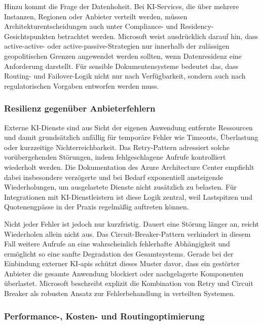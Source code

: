 Hinzu kommt die Frage der Datenhoheit. Bei KI-Services, die über mehrere Instanzen, Regionen oder Anbieter verteilt werden, müssen Architekturentscheidungen auch unter Compliance- und Residency-Gesichtspunkten betrachtet werden. Microsoft weist ausdrücklich darauf hin, dass active-active- oder active-passive-Strategien nur innerhalb der zulässigen geopolitischen Grenzen angewendet werden sollten, wenn Datenresidenz eine Anforderung darstellt. Für sensible Dokumentensysteme bedeutet das, dass Routing- und Failover-Logik nicht nur nach Verfügbarkeit, sondern auch nach regulatorischen Vorgaben entworfen werden muss. \cite{azure_openai_gateway_multi_backend}

\subsubsection{Resilienz gegenüber Anbieterfehlern}

Externe KI-Dienste sind aus Sicht der eigenen Anwendung entfernte Ressourcen und damit grundsätzlich anfällig für temporäre Fehler wie Timeouts, Überlastung oder kurzzeitige Nichterreichbarkeit. Das Retry-Pattern adressiert solche vorübergehenden Störungen, indem fehlgeschlagene Aufrufe kontrolliert wiederholt werden. Die Dokumentation des Azure Architecture Center empfiehlt dabei insbesondere verzögerte und bei Bedarf exponentiell ansteigende Wiederholungen, um ausgelastete Dienste nicht zusätzlich zu belasten. Für Integrationen mit KI-Dienstleistern ist diese Logik zentral, weil Lastspitzen und Quotenengpässe in der Praxis regelmäßig auftreten können. \cite{azure_retry_pattern}

Nicht jeder Fehler ist jedoch nur kurzfristig. Dauert eine Störung länger an, reicht Wiederholen allein nicht aus. Das Circuit-Breaker-Pattern verhindert in diesem Fall weitere Aufrufe an eine wahrscheinlich fehlerhafte Abhängigkeit und ermöglicht so eine sanfte Degradation des Gesamtsystems. Gerade bei der Einbindung externer KI-\acrshort{api}s schützt dieses Muster davor, dass ein gestörter Anbieter die gesamte Anwendung blockiert oder nachgelagerte Komponenten überlastet. Microsoft beschreibt explizit die Kombination von Retry und Circuit Breaker als robusten Ansatz zur Fehlerbehandlung in verteilten Systemen. \cite{azure_circuit_breaker,azure_retry_pattern}

\subsubsection{Performance-, Kosten- und Routingoptimierung}


